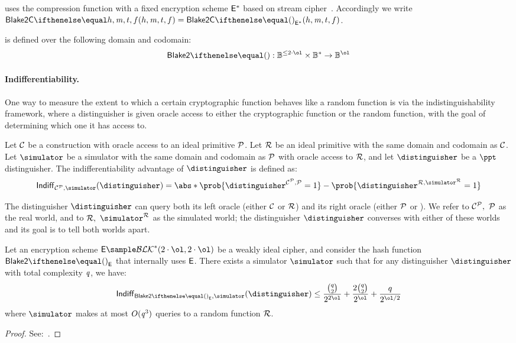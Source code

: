 \zeth uses the  compression function with a fixed encryption scheme $\mathsf{E}^*$ based on \chacha{} stream cipher~\cite{bernstein2008chacha}. Accordingly we write $\blake{2C}{h, \msg, t, f} = \blake{2C}{}_{\Enc^*}(h, \msg, t, f)$.

 is defined over the following domain and codomain:
\[
    \blake{2}{}: \BB^{\leq 2 \cdot \ol} \times \BB^{*} \to \BB^{\ol}
\]

\paragraph{Indifferentiability.}

One way to measure the extent to which a certain cryptographic function behaves like a random function is via the indistinguishability framework, where a distinguisher is given oracle access to either the cryptographic function or the random function, with the goal of determining which one it has access to.

\begin{definition}\label{appendix:blake:secmod:WICM:indiff}
    Let $\mathcal{C}$ be a construction with oracle access to an ideal primitive $\mathcal{P}$. Let $\mathcal{R}$ be an ideal primitive with the same domain and codomain as $\mathcal{C}$. Let $\simulator$ be a simulator with the same domain and codomain as $\mathcal{P}$ with oracle access to $\mathcal{R}$, and let $\distinguisher$ be a $\ppt$ distinguisher. The indifferentiability advantage of $\distinguisher$ is defined as:
    \[
        \indiff_{\primC^\primP, \simulator}(\distinguisher) = \abs*{\prob{\distinguisher^{\primC^\primP, \primP} = 1} - \prob{\distinguisher^{\primR, \simulator^\primR} = 1}}
    \]
\end{definition}

The distinguisher $\distinguisher$ can query both its left oracle (either $\mathcal{C}$ or $\mathcal{R}$) and its right oracle (either $\mathcal{P}$ or \simulator). We refer to $\mathcal{C}^\mathcal{P},\ \mathcal{P}$ as the real world, and to $\primR,\ \simulator^\primR$ as the simulated world; the distinguisher $\distinguisher$ converses with either of these worlds and its goal is to tell both worlds apart.

\begin{theorem}
Let an encryption scheme $\Enc \sample \blockSet^*(2 \cdot \ol, 2 \cdot \ol)$ be a weakly ideal cipher, and consider the hash function $\blake{2}{}_\Enc$ that internally uses $\mathsf{E}$. There exists a simulator $\simulator$ such that for any distinguisher $\distinguisher$ with total complexity $\mathit{q}$, we have:
    \[
        \indiff_{\blake{2}{}_\Enc, \simulator}(\distinguisher) \leq \frac{\binom q 2}{2^{2\ol}} + \frac{2 \binom q 2}{2^{\ol}} + \frac{q}{2^{\ol/2}}
    \]
    where $\simulator$ makes at most $O(\mathit{q}^3)$ queries to a random function $\mathcal{R}$.
\end{theorem}
\begin{proof}
    See:~\cite[Corollary 1]{luykx2016security}.
\end{proof}

